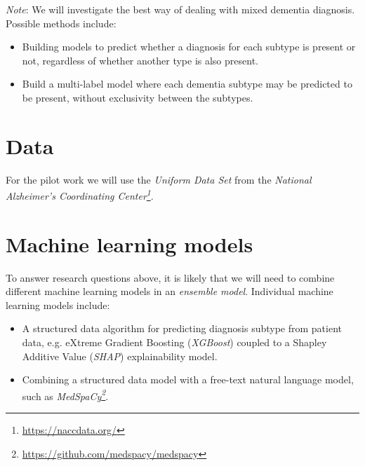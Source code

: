 \documentclass{article}
\begin{document}
\emph{Note}: We will investigate the best way of dealing with mixed dementia diagnosis. Possible methods include:

\begin{itemize}
    \item Building models to predict whether a diagnosis for each subtype is present or not, regardless of whether another type is also present.
    \item Build a multi-label model where each dementia subtype may be predicted to be present, without exclusivity between the subtypes.
\end{itemize}


\section{Data}

For the pilot work we will use the \emph{Uniform Data Set} from the \emph{National Alzheimer's Coordinating Center\footnote{\url{https://naccdata.org/}}}. 

\section{Machine learning models}

To answer research questions above, it is likely that we will need to combine different machine learning models in an \emph{ensemble model}. Individual machine learning models include:
\begin{itemize}
    \item A structured data algorithm for predicting diagnosis subtype from patient data, e.g. eXtreme Gradient Boosting (\emph{XGBoost}) coupled to a Shapley Additive Value (\emph{SHAP}) explainability model.
    \item Combining a structured data model with a free-text natural language model, such as \emph{MedSpaCy\footnote{\url{https://github.com/medspacy/medspacy}}}.

\end{itemize}



\end{document}
